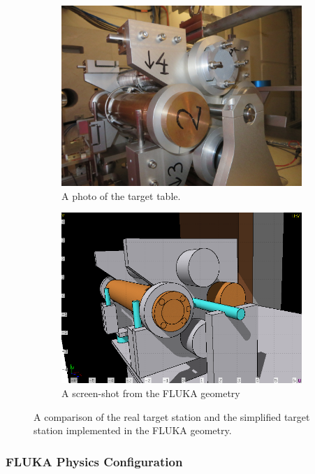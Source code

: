 \begin{figure}[!ht]
\centering
\begin{subfigure}{.5\textwidth}
  \centering
  \includegraphics[width=0.9\linewidth]{./images/IMG_1149}
  \caption{A photo of the target table.}
  \label{fig:fluka_target_photo}
\end{subfigure}%
\begin{subfigure}{.5\textwidth}
  \centering
  \includegraphics[width=0.9\linewidth]{./images/target_photo_perspective}
  \caption{A screen-shot from the FLUKA geometry}
  \label{fig:fluka_target_geometry}
\end{subfigure}
\caption{A comparison of the real target station and the simplified target station implemented in the FLUKA geometry.}
\label{fig:fluka_target_comparison}
\end{figure}

\subsubsection{FLUKA Physics Configuration}

